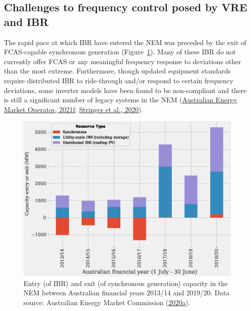 \documentclass[12pt,a4paper,]{report}
\begin{document}
\hypertarget{challenges-to-frequency-control-posed-by-vre-and-ibr}{%
\subsection{Challenges to frequency control posed by VRE and
IBR}\label{challenges-to-frequency-control-posed-by-vre-and-ibr}}

The rapid pace at which IBR have entered the NEM was preceded by the
exit of FCAS-capable synchronous generation
(Figure~\ref{fig:entry_exit}). Many of these IBR do not currently offer
FCAS or any meaningful frequency response to deviations other than the
most extreme. Furthermore, though updated equipment standards require
distributed IBR to ride-through and/or respond to certain frequency
deviations, some inverter models have been found to be non-compliant and
there is still a significant number of legacy systems in the NEM
(\protect\hyperlink{ref-australianenergymarketoperatorBehaviourDistributedResources2021}{Australian
Energy Market Operator, 2021f};
\protect\hyperlink{ref-stringerConsumerLedTransitionAustralia2020}{Stringer
et al., 2020}).

\begin{figure}
\hypertarget{fig:entry_exit}{%
\centering
\includegraphics{source/figures/synchronous_ibr_entry_exit.eps}
\caption[Entry and exit of generation capacity in the NEM between
2013/14 and 2019/20]{Entry (of IBR) and exit (of synchronous generation)
capacity in the NEM between Australian financial years 2013/14 and
2019/20. Data source: Australian Energy Market Commission
(\protect\hyperlink{ref-australianenergymarketcommissionAnnualMarketPerformance2020}{2020a}).}\label{fig:entry_exit}
}
\end{figure}
\end{document}
